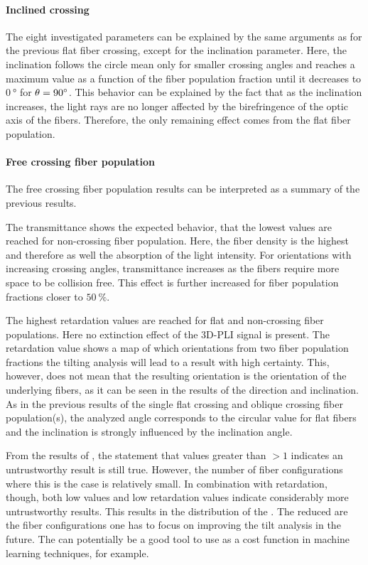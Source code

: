 \paragraph{Inclined crossing}
The eight investigated parameters can be explained by the same arguments as for the previous flat fiber crossing, except for the inclination parameter.
Here, the inclination follows the circle mean only for smaller crossing angles and reaches a maximum value as a function of the fiber population fraction \modelPsi{} until it decreases to $\SI{0}{\degree}$ for $\textnormal{$\theta$} = \SI{90}{\degree}$.
This behavior can be explained by the fact that as the inclination increases, the light rays are no longer affected by the birefringence of the optic axis of the fibers.
Therefore, the only remaining effect comes from the flat fiber population.
%
%
%
\paragraph{Free crossing fiber population}
The free crossing fiber population results can be interpreted as a summary of the previous results.
\par
%
The transmittance shows the expected behavior, that the lowest values are reached for non-crossing fiber population.
Here, the fiber density is the highest and therefore as well the absorption of the light intensity.
For orientations with increasing crossing angles, transmittance increases as the fibers require more space to be collision free.
This effect is further increased for fiber population fractions closer to $\SI{50}{\percent}$.
\par
%
The highest retardation values are reached for flat and non-crossing fiber populations.
Here no extinction effect of the \ac{3D-PLI} signal is present.
The retardation value shows a map of which orientations from two fiber population fractions the tilting analysis will lead to a result with high certainty.
This, however, does not mean that the resulting orientation is the orientation of the underlying fibers, as it can be seen in the results of the direction and inclination.
As in the previous results of the single flat crossing and oblique crossing fiber population(s), the analyzed angle corresponds to the circular value for flat fibers and the inclination is strongly influenced by the inclination angle.
\par
%
From the results of \trel{}, the statement that \trel{} values greater than $>1$ indicates an untrustworthy result is still true.
However, the number of fiber configurations where this is the case is relatively small.
In combination with retardation, though, both low \trel{} values and low retardation values indicate considerably more untrustworthy results.
This results in the distribution of the \accvalue{}.
The reduced \accvalue{} are the fiber configurations one has to focus on improving the tilt analysis in the future.
The \accvalue{} can potentially be a good tool to use as a cost function in machine learning techniques, for example.
%
%
%
